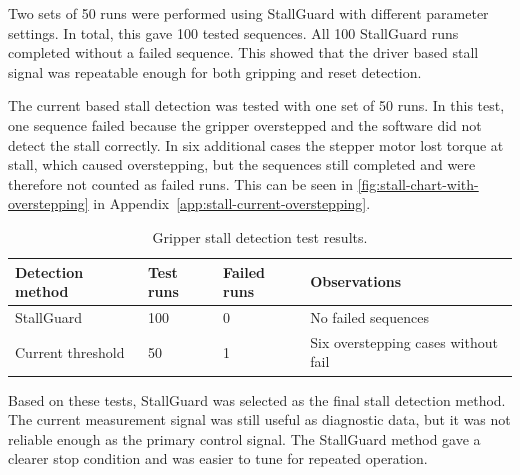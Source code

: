 Two sets of 50 runs were performed using StallGuard with different parameter settings. In total, this gave 100 tested sequences. All 100 StallGuard runs completed without a failed sequence. This showed that the driver based stall signal was repeatable enough for both gripping and reset detection.

The current based stall detection was tested with one set of 50 runs. In this test, one sequence failed because the gripper overstepped and the software did not detect the stall correctly. In six additional cases the stepper motor lost torque at stall, which caused overstepping, but the sequences still completed and were therefore not counted as failed runs. This can be seen in \cref{fig:stall-chart-with-overstepping} in Appendix~\ref{app:stall-current-overstepping}.

\begin{table}[H]
\centering
\small
\begin{tabular}{|p{}|p{}|p{}|p{}|}
\hline
Detection method & Test runs & Failed runs & Observations \\
\hline
StallGuard & 100 & 0 & No failed sequences \\
\hline
Current threshold & 50 & 1 & Six overstepping cases without fail \\
\hline
\end{tabular}
\caption{Gripper stall detection test results.}
\label{tab:gripper-stall-detection-results}
\end{table}

Based on these tests, StallGuard was selected as the final stall detection method. The current measurement signal was still useful as diagnostic data, but it was not reliable enough as the primary control signal. The StallGuard method gave a clearer stop condition and was easier to tune for repeated operation.
